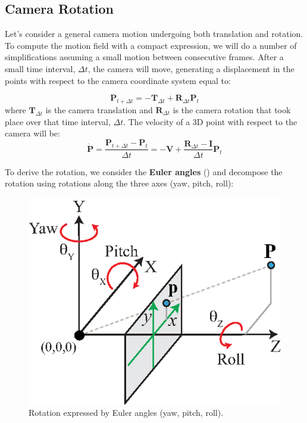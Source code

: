 \subsection{Camera Rotation}

Let's consider a general camera motion undergoing both translation and rotation. To compute the motion field with a compact expression, we will do a number of simplifications assuming a small motion between consecutive frames. After a small time interval, $\Delta t$, the camera will move, generating a displacement in the points with respect to the camera coordinate system equal to:

\begin{equation}
    \mathbf{P}_{t+\Delta t} = - \mathbf{T}_{\Delta t}  + \mathbf{R}_{\Delta t} \mathbf{P}_t
\end{equation}
where $\mathbf{T}_{\Delta t}$ is the camera translation and $\mathbf{R}_{\Delta t}$ is the camera rotation that took place over that time interval, $\Delta t$. The velocity of a 3D point with respect to the camera will be:
\begin{equation}
    \dot{\mathbf{P}} = \frac{\mathbf{P}_{t+\Delta t} - \mathbf{P}_{t}}{\Delta t} = - \mathbf{V} + \frac{\mathbf{R}_{\Delta t} -\mathbf{I}}{\Delta t} \mathbf{P}_t
    \label{eq:general_camera_motion_equation_full}
\end{equation}

To derive the rotation, we consider the {\bf Euler angles}  (\fig{\ref{fig:yaw_pitch_roll}}) and decompose the rotation using rotations along the three axes (yaw, pitch, roll):
\begin{figure}[h!]
    \centerline{
        \includegraphics[width=.4\linewidth]{figures/optical_flow/yaw_pitch_roll.eps}
    }
    \caption{Rotation expressed by Euler angles (yaw, pitch, roll).}
    \label{fig:yaw_pitch_roll}
\end{figure}

